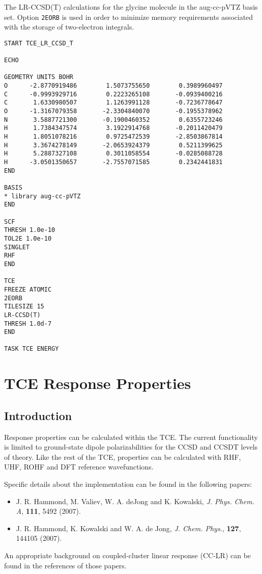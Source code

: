 The LR-CCSD(T) calculations for the glycine molecule in the aug-cc-pVTZ basis set.
Option {\tt 2EORB} is used in order to minimize memory requirements 
associated with the storage of two-electron integrals.

\begin{verbatim}
START TCE_LR_CCSD_T

ECHO

GEOMETRY UNITS BOHR
O      -2.8770919486        1.5073755650        0.3989960497
C      -0.9993929716        0.2223265108       -0.0939400216
C       1.6330980507        1.1263991128       -0.7236778647
O      -1.3167079358       -2.3304840070       -0.1955378962
N       3.5887721300       -0.1900460352        0.6355723246
H       1.7384347574        3.1922914768       -0.2011420479
H       1.8051078216        0.9725472539       -2.8503867814
H       3.3674278149       -2.0653924379        0.5211399625
H       5.2887327108        0.3011058554       -0.0285088728
H      -3.0501350657       -2.7557071585        0.2342441831
END

BASIS
* library aug-cc-pVTZ
END

SCF
THRESH 1.0e-10
TOL2E 1.0e-10
SINGLET
RHF
END

TCE
FREEZE ATOMIC
2EORB
TILESIZE 15
LR-CCSD(T)
THRESH 1.0d-7
END

TASK TCE ENERGY

\end{verbatim} 


\section{TCE Response Properties}

\subsection{Introduction}

Response properties can be calculated within the TCE.  The current functionality is limited to ground-state dipole polarizabilities for the CCSD and CCSDT levels of theory.  Like the rest of the TCE, properties can be calculated with RHF, UHF, ROHF and DFT reference wavefunctions.

Specific details about the implementation can be found in the following papers:
\begin{itemize}
\item J. R. Hammond, M. Valiev, W. A. deJong and K. Kowalski, \textit{J. Phys. Chem. A}, \textbf{111}, 5492 (2007).
\item J. R. Hammond, K. Kowalski and W. A. de Jong, \textit{J. Chem. Phys.}, \textbf{127}, 144105 (2007).
\end{itemize}
An appropriate background on coupled-cluster linear response (CC-LR) can be found in the references of those papers.

